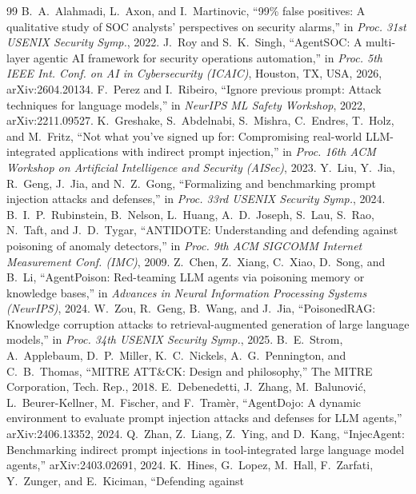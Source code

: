 \documentclass[conference]{IEEEtran}
\begin{document}
\begin{thebibliography}{99}
 B.~A.~Alahmadi, L.~Axon, and I.~Martinovic, ``99\% false positives: A qualitative study of SOC
analysts' perspectives on security alarms,'' in \emph{Proc. 31st USENIX Security Symp.}, 2022.
 J.~Roy and S.~K.~Singh, ``AgentSOC: A multi-layer agentic AI framework for security operations
automation,'' in \emph{Proc. 5th IEEE Int. Conf. on AI in Cybersecurity (ICAIC)}, Houston, TX, USA, 2026,
arXiv:2604.20134.
 F.~Perez and I.~Ribeiro, ``Ignore previous prompt: Attack techniques for language models,'' in
\emph{NeurIPS ML Safety Workshop}, 2022, arXiv:2211.09527.
 K.~Greshake, S.~Abdelnabi, S.~Mishra, C.~Endres, T.~Holz, and M.~Fritz, ``Not what you've signed
up for: Compromising real-world LLM-integrated applications with indirect prompt injection,'' in \emph{Proc. 16th
ACM Workshop on Artificial Intelligence and Security (AISec)}, 2023.
 Y.~Liu, Y.~Jia, R.~Geng, J.~Jia, and N.~Z.~Gong, ``Formalizing and benchmarking prompt injection
attacks and defenses,'' in \emph{Proc. 33rd USENIX Security Symp.}, 2024.
 B.~I.~P.~Rubinstein, B.~Nelson, L.~Huang, A.~D.~Joseph, S.~Lau, S.~Rao, N.~Taft, and
J.~D.~Tygar, ``ANTIDOTE: Understanding and defending against poisoning of anomaly detectors,'' in \emph{Proc. 9th
ACM SIGCOMM Internet Measurement Conf. (IMC)}, 2009.
 Z.~Chen, Z.~Xiang, C.~Xiao, D.~Song, and B.~Li, ``AgentPoison: Red-teaming LLM agents via
poisoning memory or knowledge bases,'' in \emph{Advances in Neural Information Processing Systems (NeurIPS)}, 2024.
 W.~Zou, R.~Geng, B.~Wang, and J.~Jia, ``PoisonedRAG: Knowledge corruption attacks to
retrieval-augmented generation of large language models,'' in \emph{Proc. 34th USENIX Security Symp.}, 2025.
 B.~E.~Strom, A.~Applebaum, D.~P.~Miller, K.~C.~Nickels, A.~G.~Pennington, and C.~B.~Thomas,
``MITRE ATT\&CK: Design and philosophy,'' The MITRE Corporation, Tech. Rep., 2018.
 E.~Debenedetti, J.~Zhang, M.~Balunovi\'{c}, L.~Beurer-Kellner, M.~Fischer, and F.~Tram\`{e}r,
``AgentDojo: A dynamic environment to evaluate prompt injection attacks and defenses for LLM agents,''
arXiv:2406.13352, 2024.
 Q.~Zhan, Z.~Liang, Z.~Ying, and D.~Kang, ``InjecAgent: Benchmarking indirect prompt injections
in tool-integrated large language model agents,'' arXiv:2403.02691, 2024.
 K.~Hines, G.~Lopez, M.~Hall, F.~Zarfati, Y.~Zunger, and E.~Kiciman, ``Defending against

\end{thebibliography}
\end{document}

